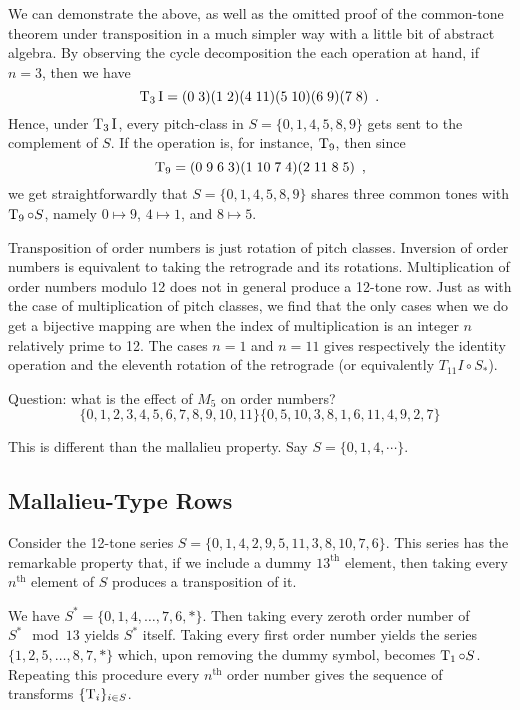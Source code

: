 We can demonstrate the above, as well as the omitted proof of the common-tone theorem under transposition in a much simpler way with a little bit of abstract algebra. By observing the cycle decomposition the each operation at hand, if $n = 3$, then we have
$$
\operatorname{T}_3\operatorname{I} = (0 \; 3) (1 \; 2) (4 \; 11) (5 \; 10) (6 \; 9) (7 \; 8) \enspace.
$$
Hence, under $\operatorname{T}_3\operatorname{I}$, every pitch-class in $S = \{ 0, 1, 4, 5, 8, 9 \}$ gets sent to the complement of $S$. If the operation is, for instance, $\operatorname{T}_9$, then since
$$
\operatorname{T}_9 = (0 \; 9 \; 6 \; 3) (1 \; 10 \; 7 \; 4) (2 \; 11 \; 8 \; 5) \enspace,
$$
we get straightforwardly that $S = \{ 0, 1, 4, 5, 8, 9 \}$ shares three common tones with $\operatorname{T}_9 \circ S$, namely $0 \mapsto 9$, $4 \mapsto 1$, and $8 \mapsto 5$.


Transposition of order numbers is just rotation of pitch classes. Inversion of order numbers is equivalent to taking the retrograde and its rotations. Multiplication of order numbers modulo 12 does not in general produce a 12-tone row. Just as with the case of multiplication of pitch classes, we find that the only cases when we do get a bijective mapping are when the index of multiplication is an integer $n$ relatively prime to 12. The cases $n = 1$ and $n = 11$ gives respectively the identity operation and the eleventh rotation of the retrograde (or equivalently $T_{11}I \circ S_*$).

Question: what is the effect of $M_5$ on order numbers?
$$
\{ 0, 1, 2, 3, 4, 5, 6, 7, 8, 9, 10, 11 \}
\{ 0, 5, 10, 3, 8, 1, 6, 11, 4, 9, 2, 7 \}
$$

This is different than the mallalieu property. Say $S = \{ 0, 1, 4, \cdots \}$.

\subsection{Mallalieu-Type Rows}

Consider the 12-tone series $S = \{ 0, 1, 4, 2, 9, 5, 11, 3, 8, 10, 7, 6 \}$. This series has the remarkable property that, if we include a dummy $13^\text{th}$ element, then taking every $n^\text{th}$ element of $S$ produces a transposition of it.

\begin{example} We have $S^* = \{ 0, 1, 4, \dots, 7, 6, * \}$. Then taking every zeroth order number of $S^* \mod 13$ yields $S^*$ itself. Taking every first order number yields the series $\{ 1, 2, 5, \dots, 8, 7, * \}$ which, upon removing the dummy symbol, becomes $\operatorname{T}_1 \circ S$. Repeating this procedure every $n^\text{th}$ order number gives the sequence of transforms $\{ \operatorname{T}_i \}_{i \in S}$.
\end{example}

